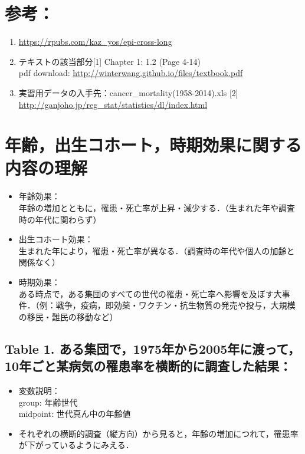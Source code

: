 \documentclass[11pt,]{article}
\providecommand{\tightlist}{%
  \setlength{\itemsep}{0pt}\setlength{\parskip}{0pt}}
\begin{document}
\section{参考：}

\begin{enumerate}
\def\labelenumi{\arabic{enumi}.}
\item
  \url{https://rpubs.com/kaz_yos/epi-cross-long}
\item
  テキストの該当部分{[}1{]} Chapter 1: 1.2 (Page 4-14)\\
  pdf download: \url{http://winterwang.github.io/files/textbook.pdf}
\item
  実習用データの入手先：cancer\_mortality(1958-2014).xls {[}2{]}
  \url{http://ganjoho.jp/reg_stat/statistics/dl/index.html}
\end{enumerate}

\section{年齢，出生コホート，時期効果に関する内容の理解}

\begin{itemize}
\tightlist
\item
  年齢効果：\\
  年齢の増加とともに，罹患・死亡率が上昇・減少する．（生まれた年や調査時の年代に関わらず）
\item
  出生コホート効果：\\
  生まれた年により，罹患・死亡率が異なる．（調査時の年代や個人の加齢と関係なく）
\item
  時期効果：\\
  ある時点で，ある集団のすべての世代の罹患・死亡率へ影響を及ぼす大事件．（例：戦争，疫病，即効薬・ワクチン・抗生物質の発売や投与，大規模の移民・難民の移動など）
\end{itemize}

\subsection{Table 1.
ある集団で，1975年から2005年に渡って，10年ごと某病気の罹患率を横断的に調査した結果：}\label{table-1.-1975200510}

\begin{itemize}
\tightlist
\item
  変数説明：\\
  group: 年齢世代\\
  midpoint: 世代真ん中の年齢値\\
\item
  それぞれの横断的調査（縦方向）から見ると，年齢の増加につれて，罹患率が下がっているようにみえる．
\end{itemize}
\end{document}
